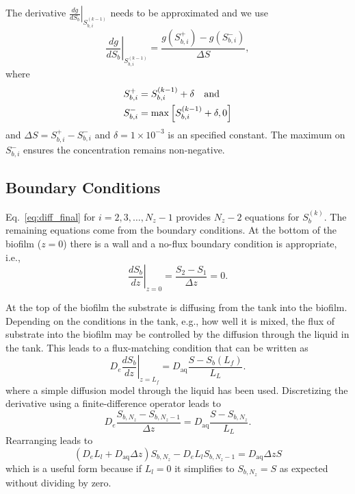 \documentclass[letterpaper, twoside]{article}
\numberwithin{equation}{section}
\newcommand{\eg}{e.g.}
\newcommand{\ie}{i.e.}
\begin{document}
The derivative $\left.\frac{d g}{d S_b}\right|_{S_{b,i}^{(k-1)}}$ needs to be approximated and we use
\begin{equation}
  \label{eq:dgds}
  \left.\frac{d g}{d S_b}\right|_{S_{b,i}^{(k-1)}} = \frac{g\left(S_{b,i}^+\right) - g\left(S_{b,i}^{-}\right)}{\Delta S},
\end{equation}
where
\begin{align*}
  S_{b,i}^+&=S_{b,i}^{(k-1)}+\delta \text{\quad and} \\
  S_{b,i}^-&=\max\left[S_{b,i}^{(k-1)}+\delta,0\right]
\end{align*}
and $\Delta S = S_{b,i}^+ - S_{b,i}^-$ and $\delta=1\times 10^{-3}$ is an specified constant.  The maximum on $S_{b,i}^-$ ensures the concentration remains non-negative.

\subsection{Boundary Conditions} \label{Boundary Conditions}
Eq.~\ref{eq:diff_final} for $i=2,3,\dots,N_z-1$ provides $N_z-2$ equations for $S_{b}^{(k)}$.  The remaining equations come from the boundary conditions.  At the bottom of the biofilm ($z=0$) there is a wall and a no-flux boundary condition is appropriate, \ie,
\begin{equation}
  \label{eq:BC1}
  \left.\frac{d S_b}{dz}\right|_{z=0}= \frac{S_2 - S_1}{\Delta z} =0.
\end{equation}

At the top of the biofilm the substrate is diffusing from the tank into the biofilm.  Depending on the conditions in the tank, \eg, how well it is mixed, the flux of substrate into the biofilm may be controlled by the diffusion through the liquid in the tank.  This leads to a flux-matching condition that can be written as
\begin{equation}
  \label{eq:BC2}
  D_e \left.\frac{d S_b}{dz}\right|_{z=L_f} = D_{\mathrm{aq}} \frac{S - S_b(L_f)}{L_L}.
\end{equation}
where a simple diffusion model through the liquid has been used.  Discretizing the derivative using a finite-difference operator leads to
\begin{equation}
  \label{eq:BC2_dis}
  D_e \frac{S_{b,N_z} - S_{b,N_z-1}}{\Delta z} = D_{\mathrm{aq}} \frac{S - S_{b,N_z}}{L_L}.
\end{equation}
Rearranging leads to
\begin{equation}
  \label{eq:BC2_dis2}
  \left(D_e L_l + D_{\mathrm{aq}} \Delta z\right) S_{b,N_z} - D_e L_l S_{b,N_z-1} = D_{\mathrm{aq}} \Delta z S
\end{equation}
which is a useful form because if $L_l=0$ it simplifies to $S_{b,N_z}=S$ as expected without dividing by zero.
\end{document}
